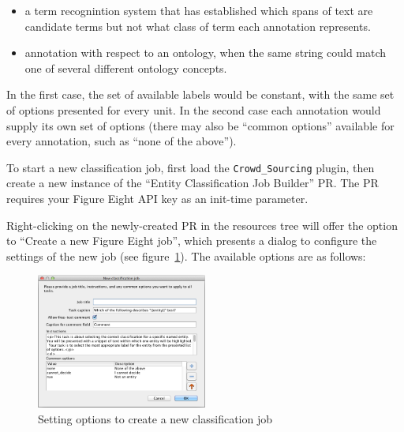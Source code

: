 \begin{itemize}
\item a term recognintion system that has established which spans of text are
  candidate terms but not what class of term each annotation represents.
\item annotation with respect to an ontology, when the same string could match
  one of several different ontology concepts.
\end{itemize}

In the first case, the set of available labels would be constant, with the same
set of options presented for every unit.  In the second case each annotation
would supply its own set of options (there may also be ``common options''
available for every annotation, such as ``none of the above'').


To start a new classification job, first load the \verb!Crowd_Sourcing! plugin,
then create a new instance of the ``Entity Classification Job Builder'' PR.
The PR requires your Figure Eight API key as an init-time parameter.

Right-clicking on the newly-created PR in the resources tree will offer the
option to ``Create a new Figure Eight job'', which presents a dialog to
configure the settings of the new job (see
figure~\ref{fig:crowd:new-classification-job}).  The available options are as
follows:

\begin{figure}[tb]
  \centering
  \includegraphics[width=0.5\textwidth]{new-classification-job-dialog.png}
  \caption{Setting options to create a new classification job}
  \label{fig:crowd:new-classification-job}
\end{figure}

